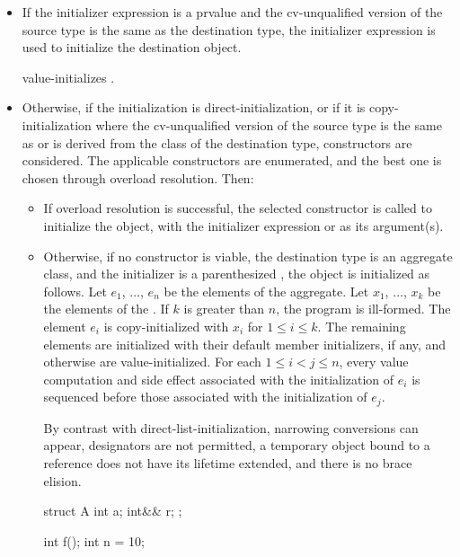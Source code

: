 \begin{itemize}
\begin{itemize}
\item
If the initializer expression is a prvalue
and the cv-unqualified version of the source type
is the same as the destination type,
the initializer expression is used to initialize the destination object.
\begin{example}
 value-initializes .
\end{example}
\item
Otherwise, if the initialization is direct-initialization,
or if it is copy-initialization where the cv-unqualified version of the source
type is the same as or is derived from the class of the destination type,
constructors are considered.
The applicable constructors
are enumerated, and the best one is chosen
through overload resolution. Then:
\begin{itemize}
\item
If overload resolution is successful,
the selected constructor
is called to initialize the object, with the initializer
expression or  as its argument(s).
\item
Otherwise, if no constructor is viable,
the destination type is
an aggregate class, and
the initializer is a parenthesized ,
the object is initialized as follows.
Let $e_1$, $\dotsc$, $e_n$ be the elements of the aggregate.
Let $x_1$, $\dotsc$, $x_k$ be the elements of the .
If $k$ is greater than $n$, the program is ill-formed.
The element $e_i$ is copy-initialized with
$x_i$ for $1 \leq i \leq k$.
The remaining elements are initialized with
their default member initializers, if any, and
otherwise are value-initialized.
For each $1 \leq i < j \leq n$,
every value computation and side effect
associated with the initialization of $e_i$
is sequenced before those associated with the initialization of $e_j$.
\begin{note}
By contrast with direct-list-initialization,
narrowing conversions can appear,
designators are not permitted,
a temporary object bound to a reference
does not have its lifetime extended, and
there is no brace elision.
\begin{example}
\begin{codeblock}
struct A {
  int a;
  int&& r;
};

int f();
int n = 10;


\end{codeblock}
\end{example}
\end{note}
\end{itemize}
\end{itemize}
\end{itemize}
